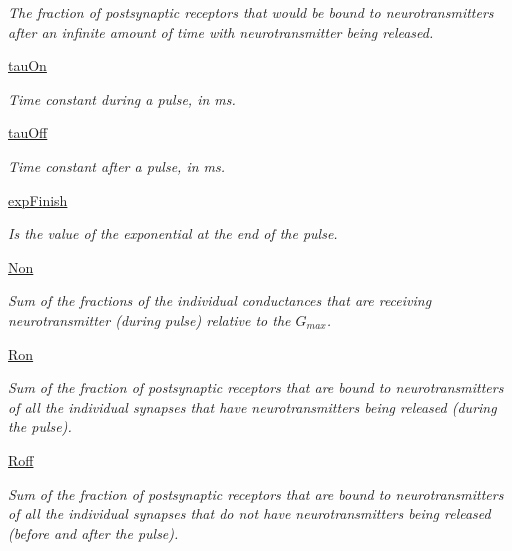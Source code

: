 \begin{DoxyCompactItemize}
\begin{DoxyCompactList}\small\item\em The fraction of postsynaptic receptors that would be bound to neurotransmitters after an infinite amount of time with neurotransmitter being released. \end{DoxyCompactList}\item 
\hyperlink{class_synapse_1_1_synapse_aae46f8edd1e94ea2ab51e3612afd3a3f}{tau\+On}
\begin{DoxyCompactList}\small\item\em Time constant during a pulse, in ms. \end{DoxyCompactList}\item 
\hyperlink{class_synapse_1_1_synapse_afd5638a223c3fdcc672002dbced7bed0}{tau\+Off}
\begin{DoxyCompactList}\small\item\em Time constant after a pulse, in ms. \end{DoxyCompactList}\item 
\hyperlink{class_synapse_1_1_synapse_aa9ae256b272ceb8e9e4a931a9cd5d163}{exp\+Finish}
\begin{DoxyCompactList}\small\item\em Is the value of the exponential at the end of the pulse. \end{DoxyCompactList}\item 
\hyperlink{class_synapse_1_1_synapse_af8779bbc2ee2c5ae7747ee5cfbcf112e}{Non}
\begin{DoxyCompactList}\small\item\em Sum of the fractions of the individual conductances that are receiving neurotransmitter (during pulse) relative to the $G_{max}$. \end{DoxyCompactList}\item 
\hyperlink{class_synapse_1_1_synapse_ae759c51a7196995510fe3eb086050c76}{Ron}
\begin{DoxyCompactList}\small\item\em Sum of the fraction of postsynaptic receptors that are bound to neurotransmitters of all the individual synapses that have neurotransmitters being released (during the pulse). \end{DoxyCompactList}\item 
\hyperlink{class_synapse_1_1_synapse_ae67ffbbd23cd9c56f20bda9e8e040663}{Roff}
\begin{DoxyCompactList}\small\item\em Sum of the fraction of postsynaptic receptors that are bound to neurotransmitters of all the individual synapses that do not have neurotransmitters being released (before and after the pulse). \end{DoxyCompactList}\item 

\end{DoxyCompactItemize}
